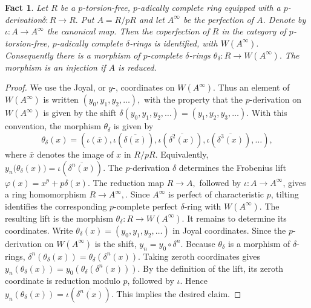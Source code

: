 \documentclass[10pt,a4paper]{amsart}
\newtheorem{fact}[theorem]{Fact}
\newcommand{\perf}{\infty}
\begin{document}
	\begin{fact}
		Let \(R\) be a \(p\)-torsion-free, \(p\)-adically complete ring equipped with a \(p\)-derivation$
		\delta:R\to R.$ Put $A=R/pR$ and let $A^{\perf}$ be the perfection of \(A\). Denote by
		$\iota:A\to A^{\perf}$ the canonical map. Then the coperfection of \(R\) in the category of \(p\)-torsion-free, \(p\)-adically complete \(\delta\)-rings is identified,   with
		$W(A^{\perf}).$ Consequently there is a morphism of \(p\)-complete \(\delta\)-rings
		$\theta_\delta:R\to W(A^{\perf}). $ The morphism is an injection if $A$ is reduced.
	\end{fact}

	\begin{proof}
		We use the Joyal, or \(y\)-, coordinates on \(W(A^{\perf})\). Thus an element of \(W(A^{\perf})\) is written
		$
		(y_0,y_1,y_2,\ldots),
		$
		with the property that the \(p\)-derivation on \(W(A^{\perf})\) is given by the shift
		$
		\delta(y_0,y_1,y_2,\ldots)
		=
		(y_1,y_2,y_3,\ldots).
		$
		With this convention, the morphism \(\theta_\delta\) is given by
		$$\theta_\delta(x)
		=
		\left(
		\iota(\overline{x}),
		\iota(\overline{\delta(x)}),
		\iota(\overline{\delta^2(x)}),
		\iota(\overline{\delta^3(x)}),
		\ldots
		\right),
		$$ 
		where \(\overline{x}\) denotes the image of \(x\) in \(R/pR\). Equivalently,
		$
		y_n\bigl(\theta_\delta(x)\bigr)
		=
		\iota (\overline{\delta^n(x)})
		.
		$
		The \(p\)-derivation \(\delta\) determines the Frobenius lift	
		$
		\varphi(x)=x^p+p\delta(x).
		$
		The reduction map
		$
		R\to A,
		$
		followed by \(\iota:A\to A^{\perf}\), gives a ring homomorphism
		$
		R\to A^{\perf},
		.
		$
		Since \(A^{\perf}\) is perfect of characteristic \(p\), tilting identifies the corresponding \(p\)-complete perfect \(\delta\)-ring with
		$
		W(A^{\perf}).
		$
		The resulting lift is the morphism
		$
		\theta_\delta:R\to W(A^{\perf}).
		$ It remains to determine its coordinates. Write
		$
		\theta_\delta(x)
		=
		(y_0,y_1,y_2,\ldots)
		$ in Joyal coordinates. Since the \(p\)-derivation on \(W(A^{\perf})\) is the shift,
		$
		y_n
		=
		y_0\circ\delta^n.
		$
		Because \(\theta_\delta\) is a morphism of \(\delta\)-rings,
		$\delta^n(\theta_\delta(x))=
		\theta_\delta(\delta^n(x)).$
		Taking zeroth coordinates gives
		$y_n(\theta_\delta(x))
		=
		y_0(\theta_\delta(\delta^n(x))).
		$ By the definition of the lift, its zeroth coordinate is reduction modulo \(p\), followed by \(\iota\). Hence
		$y_n(\theta_\delta(x))
		=
		\iota(\overline{\delta^n(x)}).$
		This implies the desired claim.
	\end{proof}
\end{document}
